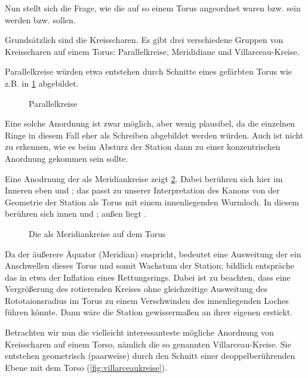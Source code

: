 Nun stellt sich die Frage, wie die  auf so einem Torus angeordnet waren bzw. sein werden bzw. sollen. 

Grundsätzlich sind die  Kreisscharen. Es gibt drei verschiedene Gruppen von Kreisscharen auf einem Torus: Parallelkreise, Merididiane und Villarceau-Kreise. 

Parallelkreise würden etwa entstehen durch Schnitte eines gefärbten Torus wie z.B. in \cref{fig:torus-parallele} abgebildet. 

\begin{figure}[ht!]
    \centering
    
    \caption{Parallelkreise}
    \label{fig:torus-parallele}
\end{figure}

Eine solche Anordnung ist zwar möglich, aber wenig plausibel, da die einzelnen Ringe in diesem Fall eher als Schreiben abgebildet werden würden. Auch ist nicht zu erkennen, wie es beim Absturz der Station dann zu einer konzentrischen Anordnung gekommen sein sollte. 

Eine Anodrnung der  als Meridiankreise  zeigt \cref{fig:torus-meridiane}.  
Dabei berühren sich hier im Inneren eben  und ; das passt zu unserer Interpretation des Kanons von der Geometrie der Station als Torus mit einem innenliegenden Wurmloch. In diesem berühren sich innen  und ; außen liegt . 

\begin{figure}[ht!]
    \centering
        
    \caption{Die  als Meridiankreise auf dem Torus}
    \label{fig:torus-meridiane}
\end{figure}


Da der äußerere Äquator (Meridian)  enspricht, bedeutet eine Ausweitung der  ein Anschwellen dieses Torus und somit Wachstum der Station; bildlich entspräche das in etwa der Inflation eines Rettungsrings. Dabei ist zu beachten, dass eine Vergrößerung des rotierenden Kreises ohne gleichzeitige Ausweitung des Rototaionsradius im Torus zu einem Verschwinden des innenliegenden Loches führen könnte. Dann wäre die Station gewissermaßen an ihrer eigenen  erstickt.

Betrachten wir nun die vielleicht interessanteste mögliche Anordnung von Kreisscharen auf einem Torso, nämlich die so genannten Villarceau-Kreise. Sie entstehen geometrisch (paarweise) durch den Schnitt einer deoppelberührenden Ebene mit dem Torso (\cref{fig:villarceaukreise}).

